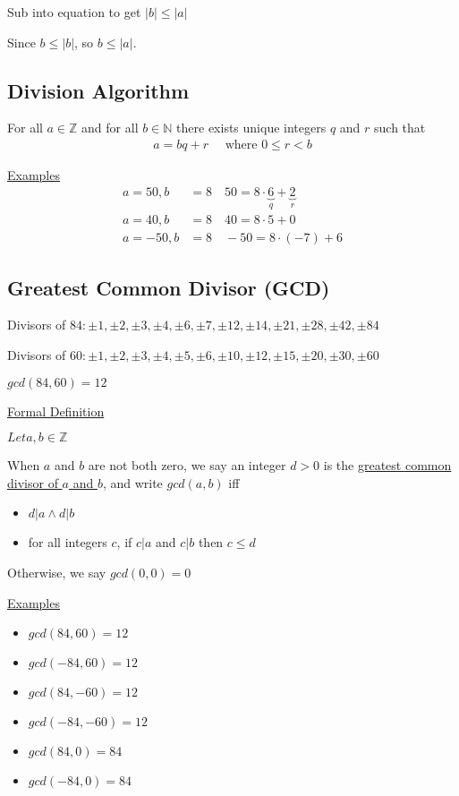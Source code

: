 \documentclass{article}
\begin{document}
Sub into equation to get $|b| \le |a|$

Since $b \le |b|$, so $b \le |a|$. 

\subsection{Division Algorithm}

For all $a \in \mathbb{Z}$ and for all $b \in \mathbb{N}$ there exists unique integers $q$ and $r$ such that 
\begin{align*}
    a = bq + r \quad \text{ where } 0 \le r < b
\end{align*}

\underline{Examples}
\begin{align*}
    a = 50, b &= 8 \quad 50 = 8 \cdot \underbrace{6}_{q} + \underbrace{2}_{r} \\
    a = 40, b &= 8 \quad 40 = 8 \cdot 5 + 0 \\
    a = -50, b &= 8 \quad -50 = 8 \cdot (-7) + 6
\end{align*}

\subsection{Greatest Common Divisor (GCD)}

Divisors of $84 : \pm 1, \pm 2, \pm 3, \pm 4, \pm 6, \pm 7, \pm 12, \pm 14, \pm 21, \pm 28, \pm 42, \pm 84$

Divisors of $60: \pm 1, \pm 2, \pm 3, \pm 4, \pm 5, \pm 6, \pm 10, \pm 12, \pm 15, \pm 20, \pm 30, \pm 60$

$gcd(84,60) = 12$

\underline{Formal Definition}

$Let a,b \in \mathbb{Z}$

When $a$ and $b$ are not both zero, we say an integer $d > 0$ is the \underline{greatest common divisor of $a$ and $b$}, and write $gcd(a,b)$ iff 
\begin{itemize}
    \item $d \vert a \wedge d \vert b$ 
    \item for all integers $c$, if $c \vert a$ and $c \vert b$ then $c \le d$
\end{itemize}

Otherwise, we say $gcd(0,0)=0$

\underline{Examples}
\begin{itemize}
    \item $gcd(84,60)=12$
    \item $gcd(-84,60)=12$
    \item $gcd(84,-60)=12$
    \item $gcd(-84,-60)=12$
    \item $gcd(84,0)=84$
    \item $gcd(-84,0)=84$
\end{itemize}
\end{document}
